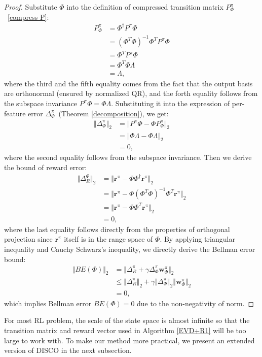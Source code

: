 \documentclass[onecolumn, conference]{IEEEtran}
\begin{document}
\begin{proof}
Substitute $\Phi$ into the definition of compressed transition matrix $P_\Phi^\pi$~\eqref{compress P}:
\begin{align*}
    P_\Phi^\pi &= \Phi^\dagger P^\pi\Phi\\
    &= (\Phi^T\Phi)^{-1}\Phi^T P^\pi\Phi\\
    &= \Phi^T P^\pi\Phi\\
    &=\Phi^T \Phi \Lambda\\
    &= \Lambda,
\end{align*}
where the third and the fifth equality comes from the fact that the output basis are orthonormal (ensured by normalized QR), and the forth equality follows from the subspace invariance $P^\pi \Phi = \Phi\Lambda$. Substituting it into the expression of per-feature error $\Delta_\Phi^\pi$~(Theorem \ref{decomposition}), we get:
\begin{align*}
    \Vert \Delta_\Phi^\pi \Vert_2 &= \Vert P^\pi \Phi - \Phi P_\Phi^\pi \Vert_2\\
    &= \Vert \Phi \Lambda - \Phi \Lambda \Vert_2\\
    &= 0,
\end{align*}
where the second equality follows from the subspace invariance. Then we derive the bound of reward error: 
\begin{align*}
	\Vert\Delta_R^\Phi \Vert_2 & = \Vert \boldsymbol{r}^\pi -\Phi\Phi^\dagger \boldsymbol{r}^\pi \Vert_2\\
	& = \Vert \boldsymbol{r}^\pi - \Phi(\Phi^T\Phi)^{-1}\Phi^T \boldsymbol{r}^\pi \Vert_2\\
	&=  \Vert \boldsymbol{r}^\pi - \Phi\Phi^T \boldsymbol{r}^\pi \Vert_2\\
	&=0,
\end{align*}
where the last equality follows directly from the properties of orthogonal projection since $\boldsymbol{r}^\pi$ itself is in the range space of $\Phi$. By applying triangular inequality and Cauchy Schwarz's inequality, we directly derive the Bellman error bound:
\begin{align*}
    \Vert BE(\Phi)\Vert_2 &= \Vert \Delta_R^{\pi} +\gamma \Delta_\Phi^\pi \boldsymbol{w}_\Phi^{\pi}\Vert_2\\
    &\le \Vert \Delta_R^{\pi}\Vert_2 + \gamma\Vert \Delta_\Phi^\pi\Vert_2 \Vert \boldsymbol{w}_\Phi^\pi\Vert_2\\
    &=0,
\end{align*}
which implies Bellman error $BE(\Phi) =0$ due to the non-negativity of norm. 
\end{proof}
For most RL problem, the scale of the state space is almost infinite so that the transition matrix and reward vector used in Algorithm \ref{EVD+R1} will be too large to work with. To make our method more practical, we present an extended version of DISCO in the next subsection.
\end{document}
